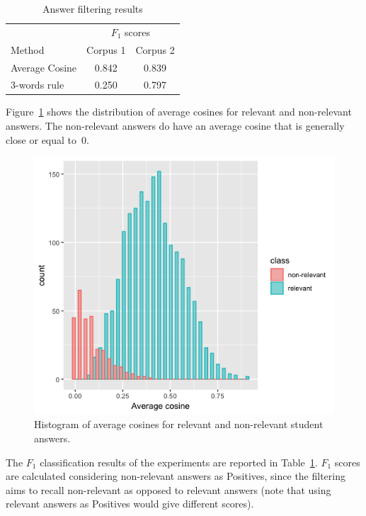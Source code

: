 \documentclass{edm_template}
\begin{document}
\begin{table}
  \caption{Answer filtering results}
  \label{tab:res}
  \begin{center}
    
    \begin{tabular}{lcc}
      \hline
      & \multicolumn{2}{c}{$F_1$ scores}\\
      \cline{2-3}
            {Method} & Corpus 1 & Corpus 2\\
            \hline
            Average Cosine & 0.842 & 0.839 \\
            3-words rule & 0.250 & 0.797 \\
            \hline
    \end{tabular}
  \end{center}
\end{table}

Figure~\ref{tab:hist1} shows the distribution of average cosines for relevant and non-relevant answers.  The non-relevant answers do have an average cosine that is generally close or equal to~0.  

\begin{figure}
  \includegraphics[width=\columnwidth]{Images/dalite_av_cosine_10clusters.png}
  \caption{Histogram of average cosines for relevant and non-relevant student answers.}
  \label{tab:hist1}
\end{figure}

The $F_1$ classification results of the experiments are reported in Table~\ref{tab:res}.  $F_1$ scores are calculated considering non-relevant answers as Positives, since the filtering aims to recall non-relevant as opposed to relevant answers (note that using relevant answers as Positives would give different scores).
\end{document}
